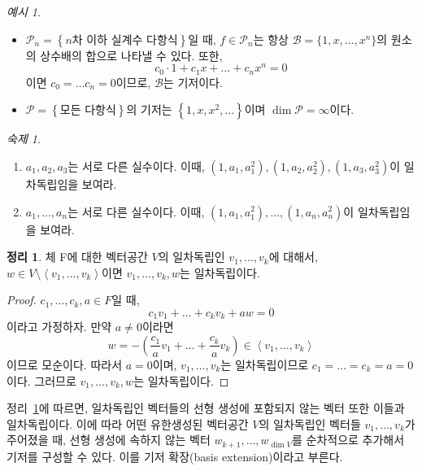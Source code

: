 \documentclass[unfonts,oneside,a4paper]{oblivoir}
\theoremstyle{definition}
\theoremstyle{theorem}
\newtheorem{theorem}{정리}[section]
\theoremstyle{theorem}
\theoremstyle{remark}
\theoremstyle{remark}
\theoremstyle{remark}
\newtheorem*{example}{예시}
\theoremstyle{remark}
\newtheorem*{homework}{숙제}
\renewcommand{\vec}[1]{\bm{\mathit{#1}}}
\newcommand{\vecz}{\bm{\mathrm{0}}}
\begin{document}
\begin{example}
    \leavevmode
    \begin{itemize}
        \item $\mathcal P_n = \left\{n\text{차 이하 실계수 다항식}\right\}$일 때, $f \in \mathcal P_n$는 항상 $\mathcal B = \{1, x, \dots, x^n\}$의 원소의 상수배의 합으로 나타낼 수 있다.
            또한,
            \[
                c_0 \cdot 1 + c_1 x + \dots + c_n x^n = 0
            \]
            이면 $c_0 = \dots c_n = 0$이므로, $\mathcal B$는 기저이다.
        \item $\mathcal P = \left\{\text{모든 다항식}\right\}$의 기저는 $\left\{1, x, x^2, \dots\right\}$이며 $\dim \mathcal{P} = \infty$이다.
    \end{itemize}
\end{example}

\begin{homework}
    \leavevmode
    \begin{enumerate}
        \item $a_1, a_2, a_3$는 서로 다른 실수이다.
            이때, $\left(1, a_1, a_1^2\right), \left(1, a_2, a_2^2\right), \left(1, a_3, a_3^2\right)$이 일차독립임을 보여라.
        \item $a_1, \dots, a_n$는 서로 다른 실수이다.
            이때, $\left(1, a_1, a_1^2\right), \dots, \left(1, a_n, a_n^2\right)$이 일차독립임을 보여라.
    \end{enumerate}
\end{homework}

\begin{theorem}\label{thm:independence}
    체 F에 대한 벡터공간 $V$의 일차독립인 $\vec v_1, \dots, \vec v_k$에 대해서, $\vec w \in V \setminus \left<\vec v_1 , \dots, \vec v_k\right>$이면 $\vec v_1, \dots, \vec v_k, \vec w$는 일차독립이다.
\end{theorem}

\begin{proof}
    $c_1, \dots, c_k, a \in F$일 때,
    \[
        c_1 \vec v_1 + \dots + c_k \vec v_k + a \vec w = \vecz
    \]
    이라고 가정하자.
    만약 $a \neq 0$이라면 
    \[
        \vec w = -\left(\frac{c_1}{a} \vec v_1 + \dots + \frac{c_k}{a} \vec v_k\right) \in \left<\vec v_1, \dots, \vec v_k\right>
    \]
    이므로 모순이다.
    따라서 $a = 0$이며, $\vec v_1, \dots, \vec v_k$는 일차독립이므로 $c_1 = \dots = c_k = a = 0$이다.
    그러므로 $\vec v_1, \dots, \vec v_k, \vec w$는 일차독립이다.
\end{proof}

정리~\ref{thm:independence}에 따르면, 일차독립인 벡터들의 선형 생성에 포함되지 않는 벡터 또한 이들과 일차독립이다.
이에 따라 어떤 유한생성된 벡터공간 $V$의 일차독립인 벡터들 $\vec v_1, \dots, \vec v_k$가 주어졌을 때, 선형 생성에 속하지 않는 벡터 $\vec w_{k + 1}, \dots, \vec w_{\dim V}$를 순차적으로 추가해서 기저를 구성할 수 있다.
이를 기저 확장(basis extension)이라고 부른다.
\end{document}
